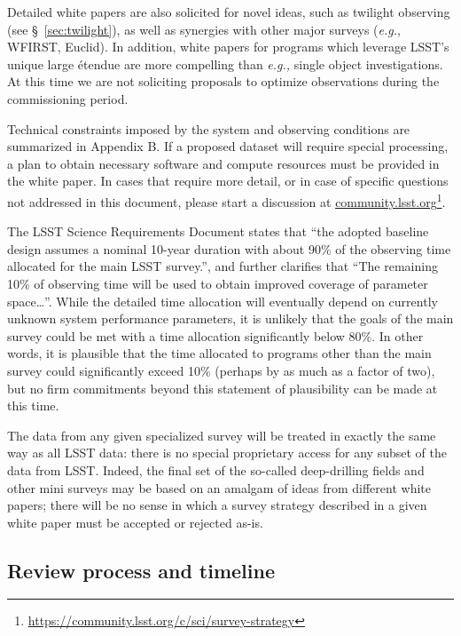 \documentclass[DM,lsstdraft,toc,usenatbib]{lsstdoc}
\begin{document}
Detailed white papers are also solicited for novel ideas, such as twilight observing (see \S~\ref{sec:twilight}), 
as well as synergies with other major surveys ({\it e.g.}, WFIRST, Euclid). In addition, white papers for programs
which leverage LSST's unique large \'{e}tendue are more compelling than {\it e.g.,} single object investigations.  
At this time we are not soliciting proposals to optimize observations during the commissioning period.

Technical constraints imposed by the system and observing conditions are summarized in 
Appendix B. If a proposed dataset will require special processing, a plan to obtain necessary software and compute resources 
must be provided in the white paper. In cases that require more detail, or in case of specific questions not addressed in this 
document, please start a discussion at \href{http://community.lsst.org}{community.lsst.org}\footnote{\url{https://community.lsst.org/c/sci/survey-strategy}}.

The LSST Science Requirements Document states that ``the adopted baseline design assumes a 
nominal 10-year duration with about 90\% of the observing time allocated for the main LSST survey.'',
and further clarifies that ``The remaining 10\% of observing time will be used to obtain improved 
coverage of parameter space\dots''. While the detailed time allocation will eventually depend on currently unknown system
performance parameters, it is unlikely that the goals of the main survey could be met with a time allocation
significantly below 80\%. In other words, it is plausible that the time allocated to programs other
than the main survey could significantly exceed 10\% (perhaps by as much as a factor of two), but 
no firm commitments beyond this statement of plausibility can be made at this time. 

The data from any given specialized survey will be treated in exactly the same way as all LSST 
data: there is no special proprietary access for any subset of the data from LSST. Indeed, the final set of the so-called
deep-drilling fields and other mini surveys may be based on an amalgam of ideas from different 
white papers; there will be no sense in which a survey strategy described in a given white paper must be accepted or rejected as-is.  


\subsection{Review process and timeline}
\end{document}
